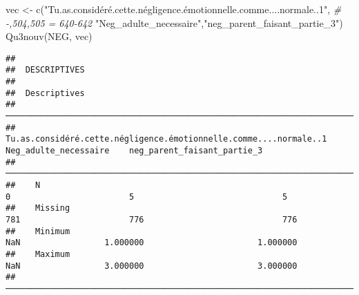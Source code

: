 \documentclass[
]{article}
\newenvironment{Shaded}{\begin{snugshade}}{\end{snugshade}}
\newcommand{\CommentTok}[1]{\textcolor[rgb]{0.56,0.35,0.01}{\textit{#1}}}
\newcommand{\FunctionTok}[1]{\textcolor[rgb]{0.00,0.00,0.00}{#1}}
\newcommand{\NormalTok}[1]{#1}
\newcommand{\OtherTok}[1]{\textcolor[rgb]{0.56,0.35,0.01}{#1}}
\newcommand{\StringTok}[1]{\textcolor[rgb]{0.31,0.60,0.02}{#1}}
\begin{document}
\begin{Shaded}
\begin{Highlighting}[]
\NormalTok{vec }\OtherTok{\textless{}{-}} \FunctionTok{c}\NormalTok{(}\StringTok{"Tu.as.considéré.cette.négligence.émotionnelle.comme....normale..1"}\NormalTok{,   }\CommentTok{\# {-},504,505 = 640{-}642}
         \StringTok{"Neg\_adulte\_necessaire"}\NormalTok{,}\StringTok{"neg\_parent\_faisant\_partie\_3"}\NormalTok{)}
\FunctionTok{Qu3nouv}\NormalTok{(NEG, vec)}
\end{Highlighting}
\end{Shaded}

\begin{verbatim}
## 
##  DESCRIPTIVES
## 
##  Descriptives                                                                                                                             
##  ──────────────────────────────────────────────────────────────────────────────────────────────────────────────────────────────────────── 
##               Tu.as.considéré.cette.négligence.émotionnelle.comme....normale..1    Neg_adulte_necessaire    neg_parent_faisant_partie_3   
##  ──────────────────────────────────────────────────────────────────────────────────────────────────────────────────────────────────────── 
##    N                                                                          0                        5                              5   
##    Missing                                                                  781                      776                            776   
##    Minimum                                                                  NaN                 1.000000                       1.000000   
##    Maximum                                                                  NaN                 3.000000                       3.000000   
##  ────────────────────────────────────────────────────────────────────────────────────────────────────────────────────────────────────────
\end{verbatim}
\end{document}

